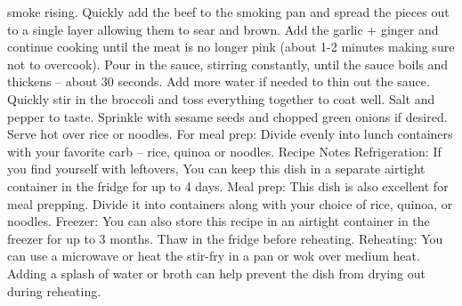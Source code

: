 smoke rising. Quickly add the beef to the smoking pan and spread the pieces out to a single layer allowing them to sear and brown. Add the garlic + ginger and continue cooking until the meat is no longer pink (about 1-2 minutes making sure not to overcook). Pour in the sauce, stirring constantly, until the sauce boils and thickens – about 30 seconds. Add more water if needed to thin out the sauce. Quickly stir in the broccoli and toss everything together to coat well. Salt and pepper to taste. Sprinkle with sesame seeds and chopped green onions if desired. Serve hot over rice or noodles. For meal prep: Divide evenly into lunch containers with your favorite carb – rice, quinoa or noodles. Recipe Notes Refrigeration: If you find yourself with leftovers, You can keep this dish in a separate airtight container in the fridge for up to 4 days. Meal prep: This dish is also excellent for meal prepping. Divide it into containers along with your choice of rice, quinoa, or noodles. Freezer: You can also store this recipe in an airtight container in the freezer for up to 3 months. Thaw in the fridge before reheating. Reheating: You can use a microwave or heat the stir-fry in a pan or wok over medium heat. Adding a splash of water or broth can help prevent the dish from drying out during reheating.
\par

